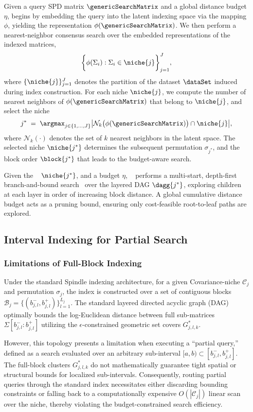 \documentclass[pdflatex,sn-mathphys-num]{sn-jnl}%
\theoremstyle{thmstyleone}%
\theoremstyle{thmstyletwo}%
\theoremstyle{thmstylethree}%
\begin{document}
Given a query SPD matrix $\genericSearchMatrix$ and a global distance budget $\eta$, \OurMethod{} begins by embedding the query into the latent indexing space via the mapping $\phi$, yielding the representation $\phi(\genericSearchMatrix)$. We then perform a nearest-neighbor consensus search over the embedded representations of the indexed matrices,
\[
\bigg\{ \phi(\Sigma_i) : \Sigma_i \in \niche{j} \bigg\}_{j=1}^{J},
\]
where $\{\niche{j}\}_{j=1}^{J}$ denotes the partition of the dataset $\dataSet$ induced during index construction. For each niche $\niche{j}$, we compute the number of nearest neighbors of $\phi(\genericSearchMatrix)$ that belong to $\niche{j}$, and select the niche
\[
j^{\ast} \;=\; \argmax_{j \in \{1,\dots,J\}} 
\bigl| \mathcal{N}_k\bigl(\phi(\genericSearchMatrix)\bigr) \cap \niche{j} \bigr|,
\]
where $\mathcal{N}_k(\cdot)$ denotes the set of $k$ nearest neighbors in the latent space. The selected niche $\niche{j^{\ast}}$ determines the subsequent permutation $\sigma_{j^{\ast}}$, and the block order $\block{j^{\ast}}$ that leads to the budget-aware search.


Given the \spdniche~ $\niche{j^{\ast}}$, and a budget $\eta$, \OurMethod~ performs a multi-start, depth-first branch-and-bound search~\cite{nau1984general} over the layered DAG $\dagg{j^{\ast}}$, exploring children at each layer in order of increasing block distance. A global cumulative distance budget acts as a pruning bound, ensuring only cost-feasible root-to-leaf paths are explored.

\subsection{Interval Indexing for Partial Search}

\subsubsection{Limitations of Full-Block Indexing}
Under the standard Spindle indexing architecture, for a given Covariance-niche $\mathcal{C}_j$ and permutation $\sigma_j$, the index is constructed over a set of contiguous blocks $\mathcal{B}_j = \{(b_{j,l}^-, b_{j,l}^+)\}_{l=1}^{L_j}$. The standard layered directed acyclic graph (DAG) optimally bounds the log-Euclidean distance between full sub-matrices $\Sigma[b_{j,l}^-:b_{j,l}^+]$ utilizing the $\epsilon$-constrained geometric set covers $G_{j,l,k}^*$. 

However, this topology presents a limitation when executing a ``partial query,'' defined as a search evaluated over an arbitrary sub-interval $[a, b) \subset [b_{j,l}^-, b_{j,l}^+]$. The full-block clusters $G_{j,l,k}^*$ do not mathematically guarantee tight spatial or structural bounds for localized sub-intervals. Consequently, routing partial queries through the standard index necessitates either discarding bounding constraints or falling back to a computationally expensive $O(|\mathcal{C}_j|)$ linear scan over the niche, thereby violating the budget-constrained search efficiency.
\end{document}
